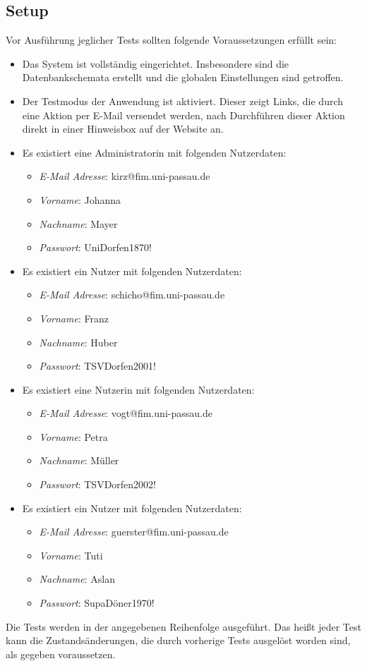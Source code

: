 
\subsection{Setup}\label{setup}
Vor Ausführung jeglicher Tests sollten folgende Voraussetzungen erfüllt sein:
\begin{itemize}
	\item Das System ist vollständig eingerichtet.
	Insbesondere sind die Datenbankschemata erstellt und die globalen Einstellungen sind getroffen.
	\item Der Testmodus der Anwendung ist aktiviert.
	Dieser zeigt Links, die durch eine Aktion per E-Mail versendet werden, nach Durchführen dieser Aktion direkt in einer Hinweisbox auf der Website an.
	\item Es existiert eine Administratorin mit folgenden Nutzerdaten:
	\begin{itemize}
		\item \emph{E-Mail Adresse}: kirz@fim.uni-passau.de
		\item \emph{Vorname}: Johanna
		\item \emph{Nachname}: Mayer
		\item \emph{Passwort}: UniDorfen1870!
	\end{itemize}
	\item Es existiert ein Nutzer mit folgenden Nutzerdaten:
	\begin{itemize}
		\item \emph{E-Mail Adresse}: schicho@fim.uni-passau.de
		\item \emph{Vorname}: Franz
		\item \emph{Nachname}: Huber
		\item \emph{Passwort}: TSVDorfen2001!
	\end{itemize}
	\item Es existiert eine Nutzerin mit folgenden Nutzerdaten:
	\begin{itemize}
		\item \emph{E-Mail Adresse}: vogt@fim.uni-passau.de
		\item \emph{Vorname}: Petra
		\item \emph{Nachname}: Müller
		\item \emph{Passwort}: TSVDorfen2002!
	\end{itemize}
	\item Es existiert ein Nutzer mit folgenden Nutzerdaten:
	\begin{itemize}
		\item \emph{E-Mail Adresse}: guerster@fim.uni-passau.de
		\item \emph{Vorname}: Tuti
		\item \emph{Nachname}: Aslan
		\item \emph{Passwort}: SupaDöner1970!
	\end{itemize}
\end{itemize}
Die Tests werden in der angegebenen Reihenfolge ausgeführt.
Das heißt jeder Test kann die Zustandsänderungen, die durch vorherige Tests ausgelöst worden sind, als gegeben voraussetzen.
